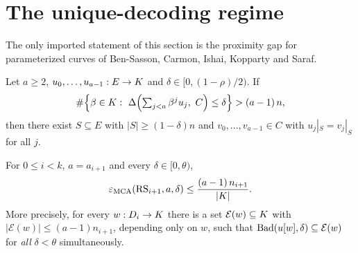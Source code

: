 \section{The unique-decoding regime}

The only imported statement of this section is the proximity gap for parameterized
curves of Ben-Sasson, Carmon, Ishai, Kopparty and Saraf.

\begin{theorem}
\label{thm:bciks-ud}
Let $a\ge2$, $u_0,\dots,u_{a-1}:E\to K$ and $\delta\in[0,(1-\rho)/2)$. If
\[
\#\Bigl\{\beta\in\K:\ \Delta\Bigl(\textstyle\sum_{j<a}\beta^ju_j,\ C\Bigr)\le\delta\Bigr\}>(a-1)\,n,
\]
then there exist $S\subseteq E$ with $|S|\ge(1-\delta)n$ and $v_0,\dots,v_{a-1}\in C$ with
$u_j|_S=v_j|_S$ for all $j$.
\end{theorem}

\begin{proposition}\label{prop:mca-ud}
For $0\le i<k$, $a=a_{i+1}$ and every $\delta\in[0,\theta)$,
\[
\varepsilon_{\mathrm{MCA}}(\mathrm{RS}_{i+1},a,\delta)\le\frac{(a-1)\,n_{i+1}}{|K|}.
\]
More precisely, for every $w:D_i\to K$ there is a set $\mathcal E(w)\subseteq K$ with
$|\mathcal E(w)|\le(a-1)n_{i+1}$, depending only on $w$, such that
$\mathrm{Bad}(u[w],\delta)\subseteq\mathcal E(w)$ for \emph{all} $\delta<\theta$ simultaneously.
\end{proposition}

